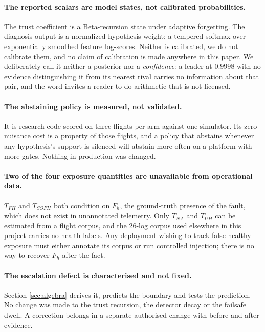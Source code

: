 \documentclass[11pt,a4paper]{article}
\begin{document}
\paragraph{The reported scalars are model states, not calibrated
probabilities.} The trust coefficient is a Beta-recursion state under adaptive
forgetting. The diagnosis output is a normalized hypothesis weight: a tempered
softmax over exponentially smoothed feature log-scores. Neither is calibrated, we do not calibrate
them, and no claim of calibration is made anywhere in this paper. We
deliberately call it neither a posterior nor a \emph{confidence}: a leader at
$0.9998$ with no evidence distinguishing it from its nearest rival carries no
information about that pair, and the word invites a reader to do arithmetic
that is not licensed.

\paragraph{The abstaining policy is measured, not validated.} It is research
code scored on three flights per arm against one simulator. Its zero nuisance
cost is a property of those flights, and a policy that abstains whenever any
hypothesis's support is silenced will abstain more often on a platform with
more gates. Nothing in production was changed.

\paragraph{Two of the four exposure quantities are unavailable from
operational data.} $T_{FH}$ and $T_{SOFH}$ both condition on $F_h$, the
ground-truth presence of the fault, which does not exist in unannotated
telemetry. Only $T_{NA}$ and $T_{UH}$ can be estimated from a flight corpus,
and the 26-log corpus used elsewhere in this project carries no health labels.
Any deployment wishing to track false-healthy exposure must either annotate its
corpus or run controlled injection; there is no way to recover $F_h$ after the
fact.

\paragraph{The escalation defect is characterised and not fixed.} Section
\ref{sec:algebra} derives it, predicts the boundary and tests the prediction.
No change was made to the trust recursion, the detector decay or the failsafe
dwell. A correction belongs in a separate authorised change with
before-and-after evidence.
\end{document}
